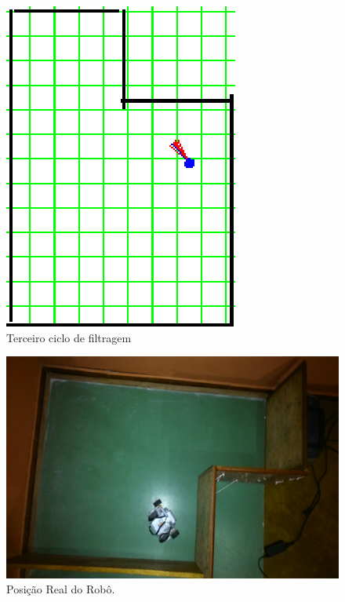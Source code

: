 \begin{figure}[H]
  \centering
  \includegraphics[scale=1]{figuras/cen1_ex5/4.eps}
  \caption[Terceiro Ciclo de Filtragem]{Terceiro ciclo de filtragem}
  \label{img:cen1_ex5_4}
\end{figure}

\begin{figure}[H]
  \centering
  \includegraphics[scale=0.8]{figuras/cen1_ex5/real.eps}
  \caption[Posição real do Robô]{Posição Real do Robô.}
  \label{img:cen1_ex5_6}
\end{figure}



